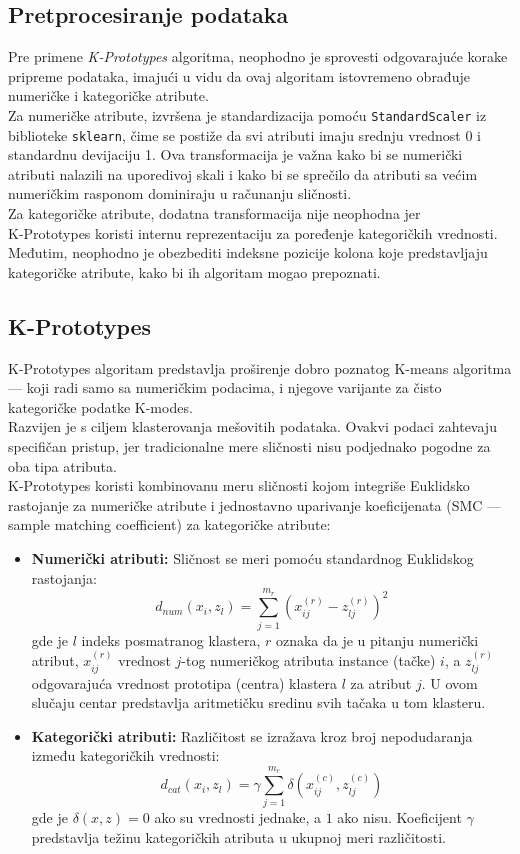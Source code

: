 \documentclass[a4paper,12pt]{article}
\begin{document}
\subsection{Pretprocesiranje podataka}
Pre primene \textit{K-Prototypes} algoritma, neophodno je sprovesti odgovarajuće korake pripreme podataka, imajući u vidu da ovaj algoritam istovremeno obrađuje numeričke i kategoričke atribute.
\\
Za numeričke atribute, izvršena je standardizacija pomoću \texttt{StandardScaler} iz biblioteke \texttt{sklearn}, čime se postiže da svi atributi imaju srednju vrednost 0 i standardnu devijaciju 1. Ova transformacija je važna kako bi se numerički atributi nalazili na uporedivoj skali i kako bi se sprečilo da atributi sa većim numeričkim rasponom dominiraju u računanju sličnosti.
\\
Za kategoričke atribute, dodatna transformacija nije neophodna jer \\K-Prototypes koristi internu reprezentaciju za poređenje kategoričkih vrednosti. Međutim, neophodno je obezbediti indeksne pozicije kolona koje predstavljaju kategoričke atribute, kako bi ih algoritam mogao prepoznati.

\subsection{K-Prototypes}

K-Prototypes algoritam predstavlja proširenje dobro poznatog K-means algoritma — koji radi samo sa numeričkim podacima, i njegove varijante za čisto kategoričke podatke K-modes.\\
Razvijen je s ciljem klasterovanja mešovitih podataka. Ovakvi podaci zahtevaju specifičan pristup, jer tradicionalne mere sličnosti nisu podjednako pogodne za oba tipa atributa.\\
K-Prototypes koristi kombinovanu meru sličnosti kojom integriše Euklidsko rastojanje za numeričke atribute i jednostavno uparivanje koeficijenata (SMC — sample matching coefficient) za kategoričke atribute:

\begin{itemize}
    \item \textbf{Numerički atributi:} Sličnost se meri pomoću standardnog Euklidskog rastojanja:
    \[
    d_{num}(x_i, z_l) = \sum_{j=1}^{m_r} (x_{ij}^{(r)} - z_{lj}^{(r)})^2
    \]
    gde je $l$ indeks posmatranog klastera, $r$ oznaka da je u pitanju numerički atribut, $x_{ij}^{(r)}$ vrednost $j$-tog numeričkog atributa instance (tačke) $i$, a $z_{lj}^{(r)}$ odgovarajuća vrednost prototipa (centra) klastera $l$ za atribut $j$. U ovom slučaju centar predstavlja aritmetičku sredinu svih tačaka u tom klasteru.

    \item \textbf{Kategorički atributi:} Različitost se izražava kroz broj nepodudaranja između kategoričkih vrednosti:
    \[
    d_{cat}(x_i, z_l) = \gamma \sum_{j=1}^{m_c} \delta(x_{ij}^{(c)}, z_{lj}^{(c)})
    \]
    gde je $\delta(x, z) = 0$ ako su vrednosti jednake, a $1$ ako nisu. Koeficijent $\gamma$ predstavlja težinu kategoričkih atributa u ukupnoj meri različitosti.
\end{itemize}
\end{document}
